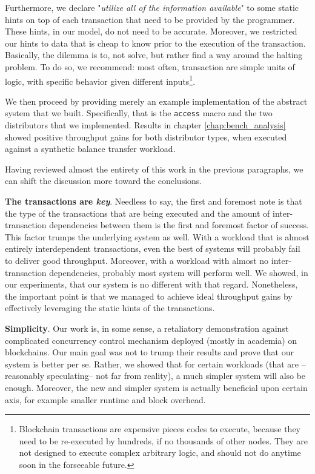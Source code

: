 Furthermore, we declare "\textit{utilize all of the information available}" to some static hints on
top of each transaction that need to be provided by the programmer. These hints, in our model, do
not need to be accurate. Moreover, we restricted our hints to data that is cheap to know prior to
the execution of the transaction. Basically, the dilemma is to, not solve, but rather find a way
around the halting problem. To do so, we recommend: most often, transaction are simple units of
logic, with specific behavior given different inputs\footnote{Blockchain transactions are expensive
pieces codes to execute, because they need to be re-executed by hundreds, if no thousands of other
nodes. They are not designed to execute complex arbitrary logic, and should not do anytime soon in
the forseeable future.}.


We then proceed by providing merely an example implementation of the abstract system that we built.
Specifically, that is the \texttt{access} macro and the two distributors that we implemented.
Results in chapter \ref{chap:bench_analysis} showed positive throughput gains for both distributor
types, when executed against a synthetic balance transfer workload.


Having reviewed almost the entirety of this work in the previous paragraphs, we can shift the
discussion more toward the conclusions.


\textbf{The transactions are \textit{key}}. Needless to say, the first and foremost note is that the
type of the transactions that are being executed and the amount of inter-transaction dependencies
between them is the first and foremost factor of success. This factor trumps the underlying system
as well. With a workload that is almost entirely interdependent transactions, even the best of
systems will probably fail to deliver good throughput. Moreover, with a workload with almost no
inter-transaction dependencies, probably most system will perform well. We showed, in our
experiments, that our system is no different with that regard. Nonetheless, the important point is
that we managed to achieve ideal throughput gains by effectively leveraging the static hints of the
transactions.

\textbf{Simplicity}. Our work is, in some sense, a retaliatory demonstration against complicated
concurrency control mechanism deployed (mostly in academia) on blockchains. Our main goal was not to
trump their results and prove that our system is better per se. Rather, we showed that for certain
workloads (that are --reasonably speculating-- not far from reality), a much simpler system will
also be enough. Moreover, the new and simpler system is actually beneficial upon certain axis, for
example smaller runtime and block overhead.

